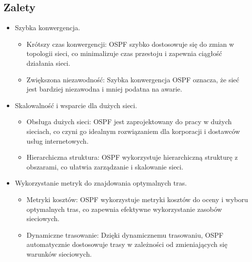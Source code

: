 \subsection{Zalety}
\begin{itemize}
    \item Szybka konwergencja.
    \begin{itemize}
        \item Krótszy czas konwergencji: OSPF szybko dostosowuje się do zmian w topologii sieci, co minimalizuje czas przestoju i zapewnia ciągłość działania sieci.
        \item Zwiększona niezawodność: Szybka konwergencja OSPF oznacza, że sieć jest bardziej niezawodna i mniej podatna na awarie.
    \end{itemize}
    \item Skalowalność i wsparcie dla dużych sieci.
    \begin{itemize}
        \item Obsługa dużych sieci: OSPF jest zaprojektowany do pracy w dużych sieciach, co czyni go idealnym rozwiązaniem dla korporacji i dostawców usług internetowych.
        \item Hierarchiczna struktura: OSPF wykorzystuje hierarchiczną strukturę z obszarami, co ułatwia zarządzanie i skalowanie sieci.
    \end{itemize}
    \item Wykorzystanie metryk do znajdowania optymalnych tras.
    \begin{itemize}
        \item Metryki kosztów: OSPF wykorzystuje metryki kosztów do oceny i wyboru optymalnych tras, co zapewnia efektywne wykorzystanie zasobów sieciowych.
        \item Dynamiczne trasowanie: Dzięki dynamicznemu trasowaniu, OSPF automatycznie dostosowuje trasy w zależności od zmieniających się warunków sieciowych.
    \end{itemize}
\end{itemize}

